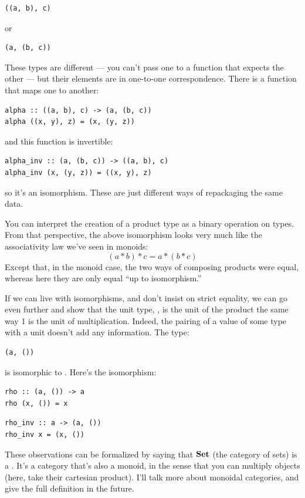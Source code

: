 \begin{Verbatim}
((a, b), c)
\end{Verbatim}
or

\begin{Verbatim}
(a, (b, c))
\end{Verbatim}
These types are different --- you can't pass one to a function that
expects the other --- but their elements are in one-to-one
correspondence. There is a function that maps one to another:

\begin{Verbatim}
alpha :: ((a, b), c) -> (a, (b, c))
alpha ((x, y), z) = (x, (y, z))
\end{Verbatim}
and this function is invertible:

\begin{Verbatim}
alpha_inv :: (a, (b, c)) -> ((a, b), c)
alpha_inv (x, (y, z)) = ((x, y), z)
\end{Verbatim}
so it's an isomorphism. These are just different ways of repackaging the
same data.

You can interpret the creation of a product type as a binary operation
on types. From that perspective, the above isomorphism looks very much
like the associativity law we've seen in monoids:
\[(a * b) * c = a * (b * c)\]
Except that, in the monoid case, the two ways of composing products were
equal, whereas here they are only equal ``up to isomorphism.''

If we can live with isomorphisms, and don't insist on strict equality,
we can go even further and show that the unit type, \code{()}, is the
unit of the product the same way 1 is the unit of multiplication.
Indeed, the pairing of a value of some type  with a unit
doesn't add any information. The type:

\begin{Verbatim}
(a, ())
\end{Verbatim}
is isomorphic to . Here's the isomorphism:

\begin{Verbatim}
rho :: (a, ()) -> a
rho (x, ()) = x
\end{Verbatim}

\begin{Verbatim}
rho_inv :: a -> (a, ())
rho_inv x = (x, ())
\end{Verbatim}
These observations can be formalized by saying that $\mathbf{Set}$ (the
category of sets) is a . It's a category that's
also a monoid, in the sense that you can multiply objects (here, take
their cartesian product). I'll talk more about monoidal categories, and
give the full definition in the future.

